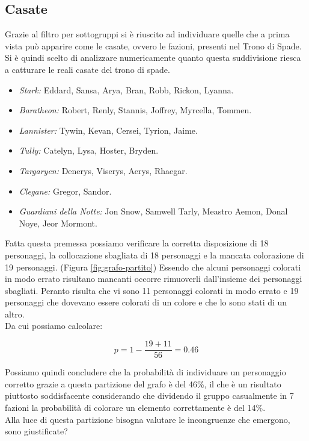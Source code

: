 \documentclass[a4paper]{article}
\begin{document}
\subsection{Casate}
Grazie al filtro per sottogruppi si è riuscito ad individuare quelle che a prima vista può apparire come le casate, ovvero le fazioni, presenti nel Trono di Spade.\\
Si è quindi scelto di analizzare numericamente quanto questa suddivisione riesca a catturare le reali casate del trono di spade.
\begin{itemize}
  \item \emph{Stark:} Eddard, Sansa, Arya, Bran, Robb, Rickon, Lyanna.
  \item \emph{Baratheon:} Robert, Renly, Stannis, Joffrey, Myrcella, Tommen.
  \item \emph{Lannister:} Tywin, Kevan, Cersei, Tyrion, Jaime.
  \item \emph{Tully:} Catelyn, Lysa, Hoster, Bryden.
  \item \emph{Targaryen:} Denerys, Viserys, Aerys, Rhaegar.
  \item \emph{Clegane:} Gregor, Sandor.
  \item \emph{Guardiani della Notte:} Jon Snow, Samwell Tarly, Meastro Aemon, Donal Noye, Jeor Mormont.
\end{itemize}

Fatta questa premessa possiamo verificare la corretta disposizione di 18 personaggi, la collocazione sbagliata di 18 personaggi e la mancata colorazione di 19 personaggi. (Figura \ref{fig:grafo-partito}) Essendo che alcuni personaggi colorati in modo errato risultano mancanti occorre rimuoverli dall'insieme dei personaggi sbagliati. Peranto risulta che vi sono 11 personaggi colorati in modo errato e 19 personaggi che dovevano essere colorati di un colore e che lo sono stati di un altro.\\ 
Da cui possiamo calcolare:

\begin{equation}
	p=1-\frac{19+11}{56}=0.46    
\end{equation}

Possiamo quindi concludere che la probabilità di individuare un personaggio corretto grazie a questa partizione del grafo è del 46\%, il che è un risultato piuttosto soddisfacente considerando che dividendo il gruppo casualmente in 7 fazioni la probabilità di colorare un elemento correttamente è del 14\%.\\

Alla luce di questa partizione bisogna valutare le incongruenze che emergono, sono giustificate?
\end{document}

